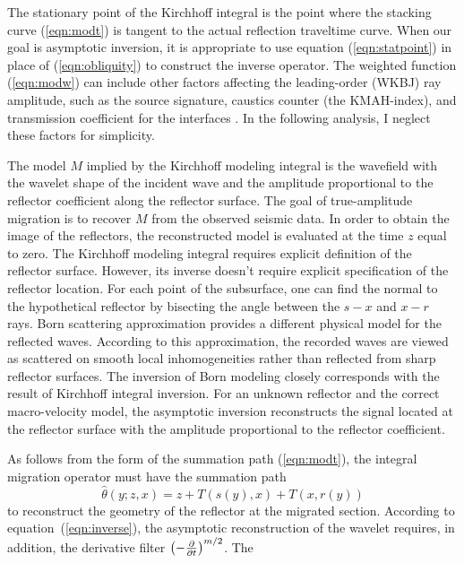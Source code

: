 The stationary point of the Kirchhoff integral is the point where the
stacking curve (\ref{eqn:modt}) is tangent to the actual reflection
traveltime curve. When our goal is asymptotic inversion, it is
appropriate to use equation (\ref{eqn:statpoint}) in place of
(\ref{eqn:obliquity}) to construct the inverse operator. The weighted
function (\ref{eqn:modw}) can include other factors affecting the
leading-order (WKBJ) ray amplitude, such as the source signature, 
caustics counter (the KMAH-index), and transmission coefficient
for the interfaces \cite[]{chapman,cerveny}. In the following analysis,
I neglect these factors for simplicity.
\par
The model $M$ implied by the Kirchhoff modeling integral is the
wavefield with the wavelet shape of the incident wave and the
amplitude proportional to the reflector coefficient along the
reflector surface. The goal of true-amplitude migration is to recover
$M$ from the observed seismic data. In order to obtain the image of
the reflectors, the reconstructed model is evaluated at the time $z$
equal to zero. The Kirchhoff modeling integral requires explicit
definition of the reflector surface. However, its inverse doesn't
require explicit specification of the reflector location. For each
point of the subsurface, one can find the normal to the hypothetical
reflector by bisecting the angle between the $s-x$ and $x-r$
rays. Born scattering approximation provides a different physical
model for the reflected waves. According to this approximation, the
recorded waves are viewed as scattered on smooth local inhomogeneities
rather than reflected from sharp reflector surfaces. The inversion of
Born modeling \cite[]{GEO52.07.09430964,GEO52.07.09310942} closely
corresponds with the result of Kirchhoff integral inversion. For an
unknown reflector and the correct macro-velocity model, the asymptotic
inversion reconstructs the signal located at the reflector surface
with the amplitude proportional to the reflector coefficient.
\par
As follows from the form of the summation path (\ref{eqn:modt}), the
integral migration operator must have the summation path
\begin{equation}
\widehat{\theta}(y;z,x)  =  z + T\left(s(y),x\right) + T\left(x,r(y)\right)
\end{equation}
to reconstruct the geometry of the reflector at the migrated section.
According to equation~(\ref{eqn:inverse}), the asymptotic
reconstruction of the wavelet requires, in addition, the derivative
filter $\left(- {\partial \over {\partial t}}\right)^{m/2}$. The
